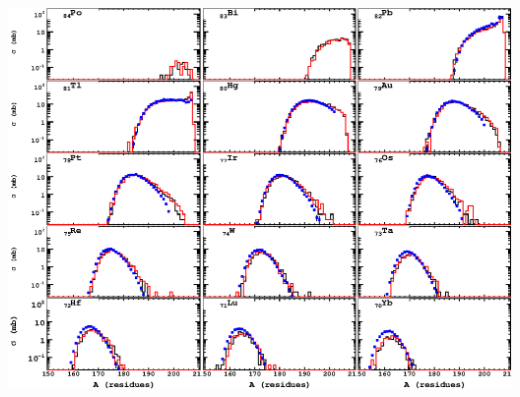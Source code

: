 \documentclass[20pt]{article}
\newenvironment{textbox}
{\begin{lrbox}{\dummybox}\begin{minipage}{0.9\columnwidth}}
{\end{minipage}\end{lrbox}\raisebox{-\depth}{\psshadowbox[framesep=1em,framearc=.1,shadow=true]{\usebox{\dummybox}}}\vspace{0.005\textheight}}
\begin{document}
\begin{center}
\begin{multicols}{3}
\begin{center}
\vspace{2cm}
\includegraphics[scale=0.60]{images/pPbIsotopes.eps}
\end{center}


\vspace{1cm}

\end{multicols}
\end{center}
\end{document}
